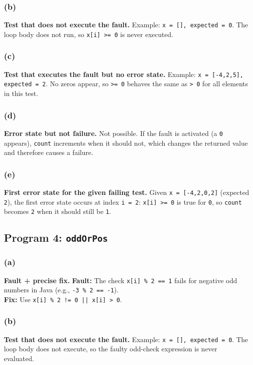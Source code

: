 \subsubsection{(b)}
\textbf{Test that does not execute the fault.}
Example: \texttt{x = [], expected = 0}. The loop body does not run, so \texttt{x[i] >= 0} is never executed.

\subsubsection{(c)}
\textbf{Test that executes the fault but no error state.}
Example: \texttt{x = [-4,2,5], expected = 2}. No zeros appear, so \texttt{>= 0} behaves the same as \texttt{> 0} for all elements in this test.

\subsubsection{(d)}
\textbf{Error state but not failure.}
Not possible. If the fault is activated (a \texttt{0} appears), \texttt{count} increments when it should not, which changes the returned value and therefore causes a failure.

\subsubsection{(e)}
\textbf{First error state for the given failing test.}
Given \texttt{x = [-4,2,0,2]} (expected \texttt{2}), the first error state occurs at index \texttt{i = 2}: \texttt{x[i] >= 0} is true for \texttt{0}, so \texttt{count} becomes \texttt{2} when it should still be \texttt{1}.

\subsection{Program 4: \texttt{oddOrPos}}
\subsubsection{(a)}
\textbf{Fault + precise fix.}
\textbf{Fault:} The check \texttt{x[i] \% 2 == 1} fails for negative odd numbers in Java (e.g., \texttt{-3 \% 2 == -1}). \\
\textbf{Fix:} Use \texttt{x[i] \% 2 != 0 || x[i] > 0}.

\subsubsection{(b)}
\textbf{Test that does not execute the fault.}
Example: \texttt{x = [], expected = 0}. The loop body does not execute, so the faulty odd-check expression is never evaluated.


